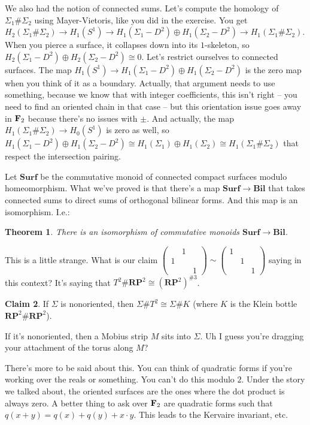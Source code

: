 \documentclass{amsart}
\theoremstyle{theorem}
\newtheorem{theorem}{Theorem}[section]
\theoremstyle{definition}
\newtheorem{claim}[theorem]{Claim}
\newcommand{\RP}{\mathbf{RP}}
\begin{document}
We also had the notion of connected sums. Let's compute the homology of $\Sigma_1\#\Sigma_2$ using Mayer-Vietoris, like you did in the exercise. You get $ H_2(\Sigma_1\#\Sigma_2)\to H_1(S^1)\to H_1(\Sigma_1-D^2)\oplus H_1(\Sigma_2-D^2)\to H_1(\Sigma_1\#\Sigma_2)$. When you pierce a surface, it collapses down into its $1$-skeleton, so $ H_2(\Sigma_1-D^2)\oplus H_2(\Sigma_2-D^2)\cong 0$. Let's restrict ourselves to connected surfaces. The map $ H_1(S^1)\to H_1(\Sigma_1-D^2)\oplus H_1(\Sigma_2-D^2)$ is the zero map when you think of it as a boundary. Actually, that argument needs to use something, because we know that with integer coefficients, this isn't right -- you need to find an oriented chain in that case -- but this orientation issue goes away in $\mathbf F_2$ because there's no issues with $\pm$. And actually, the map $ H_1(\Sigma_1\#\Sigma_2)\to H_0(S^1)$ is zero as well, so $ H_1(\Sigma_1-D^2)\oplus H_1(\Sigma_2-D^2)\cong H_1(\Sigma_1)\oplus H_1(\Sigma_2)\cong H_1(\Sigma_1\#\Sigma_2)$ that respect the intersection pairing.

Let $\mathbf{Surf}$ be the commutative monoid of connected compact surfaces modulo homeomorphism. What we've proved is that there's a map $\mathbf{Surf}\to\mathbf{Bil}$ that takes connected sums to direct sums of orthogonal bilinear forms. And this map is an isomorphism. I.e.:
\begin{theorem}
There is an isomorphism of commutative monoids $\mathbf{Surf}\to\mathbf{Bil}$.
\end{theorem}
This is a little strange. What is our claim $\begin{pmatrix}
 & 1 & \\
1 & & \\
 & & 1
\end{pmatrix}
\sim
\begin{pmatrix}
1 & & \\
& 1 & \\
& & 1
\end{pmatrix}$ saying in this context? It's saying that $T^2\#\RP^2\cong(\RP^2)^{\# 3}$.
\begin{claim}
If $\Sigma$ is nonoriented, then $\Sigma\# T^2\cong\Sigma\# K$ (where $K$ is the Klein bottle $\RP^2\#\RP^2$).
\end{claim}
If it's nonoriented, then a Mobius strip $M$ sits into $\Sigma$. Uh I guess you're dragging your attachment of the torus along $M$?

There's more to be said about this. You can think of quadratic forms if you're working over the reals or something. You can't do this modulo $2$. Under the story we talked about, the oriented surfaces are the ones where the dot product is always zero. A better thing to ask over $\mathbf F_2$ are quadratic forms such that $q(x+y)=q(x)+q(y)+x\cdot y$. This leads to the Kervaire invariant, etc.
\end{document}
